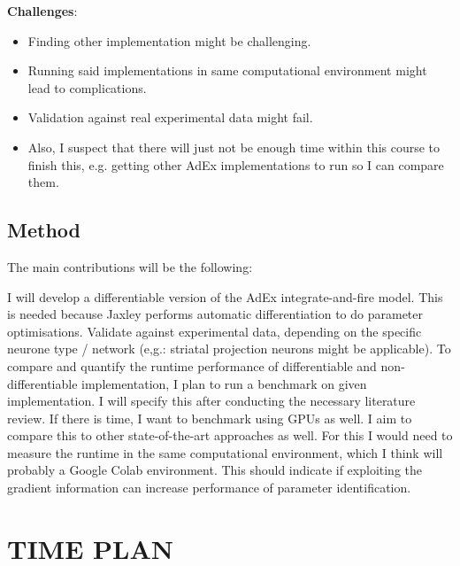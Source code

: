 \documentclass[11pt,a4paper]{article}
\begin{document}
\begin{enumerate}
    \textbf{Challenges}:
    \begin{itemize}
    \item Finding other implementation might be challenging.
    \item Running said implementations in same computational environment might lead to complications.
    \item Validation against real experimental data might fail.
    \item Also, I suspect that there will just not be enough time within this course to finish this, e.g. getting other AdEx implementations to run so I can compare them.
    \end{itemize}
\end{enumerate}

\subsection*{Method}
The main contributions will be the following:

I will develop a differentiable version of the AdEx integrate-and-fire model.
This is needed because Jaxley performs automatic differentiation to do parameter optimisations.
Validate against experimental data, depending on the specific neurone type / network (e,g.: striatal projection neurons might be applicable).
To compare and quantify the runtime performance of differentiable and non-differentiable implementation, I plan to run a benchmark on given implementation. I will specify this after conducting the necessary literature review. If there is time, I want to benchmark using GPUs as well.
I aim to compare this to other state-of-the-art approaches as well.
For this I would need to measure the runtime in the same computational environment, which I think will probably a Google Colab environment.
This should indicate if exploiting the gradient information can increase performance of parameter identification.

\section{TIME PLAN}

\end{document}
